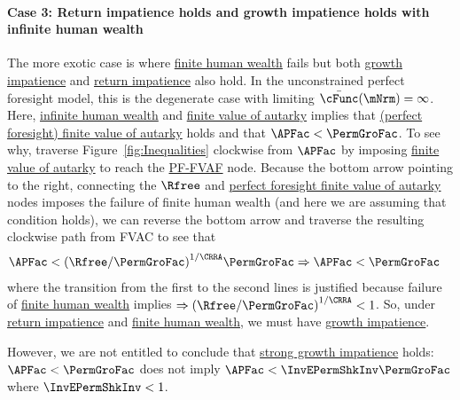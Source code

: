 \documentclass[BufferStockTheory]{subfiles}
\begin{document}
\paragraph{Case 3: Return impatience holds and growth impatience holds with infinite human wealth} The more exotic case is where \hyperlink{FHWC}{finite human wealth} fails but both \hyperlink{GIC}{growth impatience} and \hyperlink{RIC}{return impatience} also hold.
In the unconstrained perfect foresight model, this is the degenerate case with limiting $\bar{\cFunc}(\mNrm)=\infty$.
Here, \hyperlink{FHWC}{infinite human wealth} and \hyperlink{FVAC}{finite value of autarky} implies that \hyperlink{FVAC}{(perfect foresight) finite value of autarky} holds and that $ \APFac < \PermGroFac$.
To see why, traverse Figure~\ref{fig:Inequalities} clockwise from $\APFac$ by imposing \hyperlink{FVAC}{finite value of autarky} to reach the \hyperlink{PFFVAC}{PF-FVAF}  node.
Because the bottom arrow pointing to the right, connecting the $\Rfree$ and \hyperlink{PFFVAC}{perfect foresight finite value of autarky} nodes imposes the failure of finite human wealth (and here we are assuming that condition holds), we can reverse the bottom arrow and traverse the resulting clockwise path from {FVAC} to see that 
%
\begin{align*}
  & \APFac < {(\Rfree/\PermGroFac)}^{1/\CRRA}\PermGroFac \Rightarrow  \APFac < \PermGroFac
\end{align*}
%
where the transition from the first to the second lines is justified because failure of \hyperlink{FHWC}{finite human wealth} implies $\Rightarrow {(\Rfree/\PermGroFac)}^{1/\CRRA}<1$.
So, under \hyperlink{RIC}{return impatience} and \hyperlink{FHWC}{finite human wealth}, we must have \hyperlink{GIC}{growth impatience}.

However, we are not entitled to conclude that \hyperlink{GICMod}{strong growth impatience} holds: $\APFac < \PermGroFac$ does not imply $\APFac < \InvEPermShkInv \PermGroFac$ where $\InvEPermShkInv<1$.
 
 \begin{comment}
 (traverse Figure~\ref{fig:Inequalities} clockwise from $\APFac$ by imposing {\FVAC} and continue to the {\PFVAFacDefn} node):  Reversing the arrow connecting the $\Rfree$ and {\PFVAFacDefn} nodes implies that under $\cncl{\FHWC}$:
\begin{align*}
  & \overbrace{\APFac < {(\Rfree/\PermGroFac)}^{1/\CRRA}\PermGroFac}^{\PFFVAC}
  \\ & \APFac < \PermGroFac
\end{align*}
where the transition from the first to the second lines is justified because $\cncl{\FHWC} \Rightarrow {(\Rfree/\PermGroFac)}^{1/\CRRA}<1$.
So, \{\RIC, \cncl{\FHWC}\} implies the {\GICRaw} holds.

\end{comment}
\end{document}
